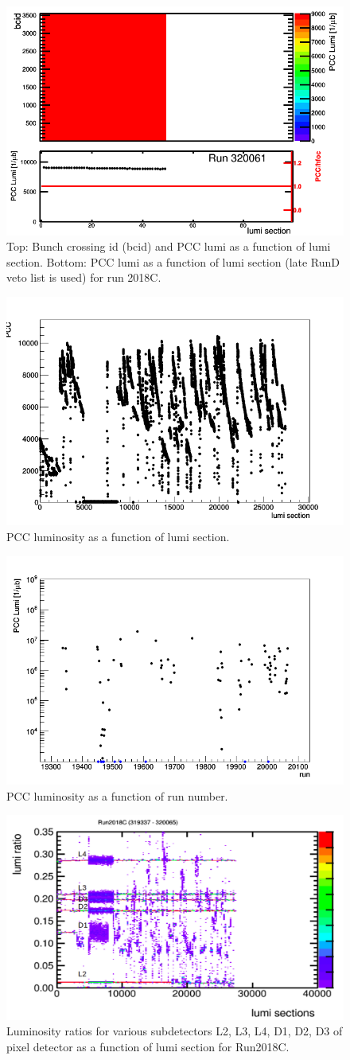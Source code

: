 \begin{figure}[H]
  \centering
  \includegraphics[width=0.5\columnwidth]{./320061.png}
  \caption{Top: Bunch crossing id (bcid) and PCC lumi as a function of lumi section. Bottom: PCC lumi as a function of lumi section (late RunD veto list is used) for run 2018C.}
  \label{fig:CMS}
\end{figure}


\begin{figure}[H]
  \centering
  \includegraphics[width=0.5\columnwidth]{./ls_lumi_2018C.png}
  \caption{PCC luminosity as a function of lumi section.}
  \label{fig:CMS}
\end{figure}


\begin{figure}[H]
  \centering
  \includegraphics[width=0.5\columnwidth]{./runs_2018C.png}
  \caption{PCC luminosity as a function of run number.}
  \label{fig:CMS}
\end{figure}


\begin{figure}[H]
  \centering
  \includegraphics[width=0.5\columnwidth]{./2018C_lumiratio.png}
  \caption{Luminosity ratios for various subdetectors L2, L3, L4, D1, D2, D3 of pixel detector as a function of lumi section for Run2018C. }
  \label{fig:CMS}
\end{figure}


